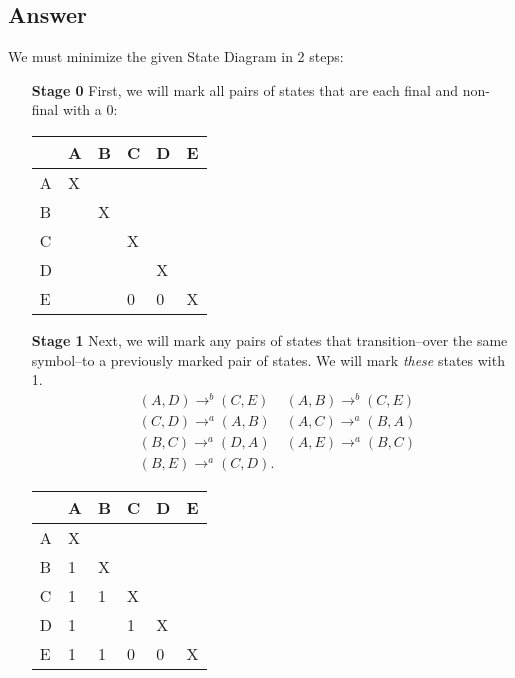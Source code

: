 \documentclass[12pt]{book}
\begin{document}
\subsection*{Answer}
We must minimize the given State Diagram in 2 steps:
\begin{enumerate}
        \item[\textbf{Stage 0}] First, we will mark all pairs of states that are each final and non-final with a 0:
                \begin{table}[h]
                \centering
                \begin{tabular}{@{}llllll@{}}
                \toprule
                  & A & B & C & D & E \\ \midrule
                A & X &   &   &   &   \\
                B &   & X &   &   &   \\
                C &   &   & X &   &   \\
                D &   &   &   & X &   \\
                E &   &   & 0 & 0 & X \\ \bottomrule
                \end{tabular}
                \end{table}
        \item[\textbf{Stage 1}] Next, we will mark any pairs of states that transition--over the same symbol--to a previously 
                marked pair of states. We will mark \textit{these} states with 1.
                \begin{align*}
                        &(A,D)\to^b (C,E)
                        &(A,B)\to^b (C,E)\\
                        &(C,D)\to^a (A,B)
                        &(A,C)\to^a (B,A)\\
                        &(B,C)\to^a (D,A)
                        &(A,E)\to^a (B,C)\\
                        &(B,E)\to^a (C,D)
                .\end{align*}
                \pagebreak
                \begin{table}[h]
                \centering
                \begin{tabular}{@{}llllll@{}}
                \toprule
                  & A & B & C & D & E \\ \midrule
                A & X &   &   &   &   \\
                B & 1 & X &   &   &   \\
                C & 1 & 1 & X &   &   \\
                D & 1 &   & 1 & X &   \\
                E & 1 & 1 & 0 & 0 & X \\ \bottomrule
                \end{tabular}
                \end{table}
                

\end{enumerate}
\end{document}
